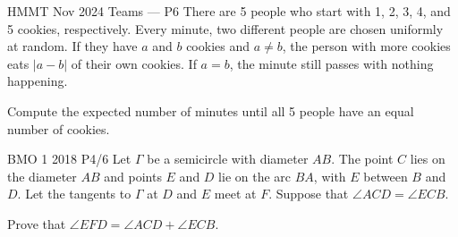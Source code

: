 \documentclass{article}
\begin{document}
\begin{problem}{HMMT Nov 2024 Teams --- P6}
There are 5 people who start with 1, 2, 3, 4, and 5 cookies, respectively.
Every minute, two
different people are chosen uniformly at random. If they have $a$ and $b$ cookies and $a\neq b$, the person
with more cookies eats $|a - b|$ of their own cookies. If $a = b$, the
minute still passes with nothing
happening. \vspace{0.2cm}

Compute the expected number of minutes until all 5 people have an equal number of cookies.
\end{problem}

\begin{problem}{BMO 1 2018 P4/6}
Let $\Gamma$ be a semicircle with diameter $AB$. The point $C$ lies on the
diameter $AB$ and points $E$ and $D$ lie on the arc $BA$, with $E$ between
$B$ and $D$. Let the tangents to $\Gamma$ at $D$ and $E$ meet at $F$.
Suppose that $\angle ACD = \angle ECB$.\vspace{0.2cm}

Prove that $\angle EFD = \angle ACD + \angle ECB$.
\end{problem}
\end{document}
